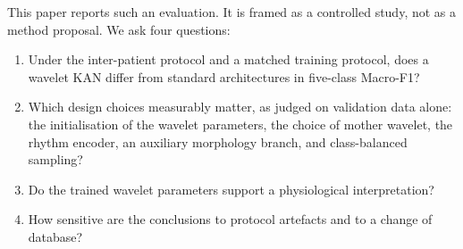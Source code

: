\documentclass[preprint,12pt]{elsarticle}
\begin{document}
This paper reports such an evaluation. It is framed as a controlled study, not as a method proposal. We ask four questions:
\begin{enumerate}
    \item[\textbf{RQ1}] Under the inter-patient protocol and a matched training protocol, does a wavelet KAN differ from standard architectures in five-class Macro-F1?
    \item[\textbf{RQ2}] Which design choices measurably matter, as judged on validation data alone: the initialisation of the wavelet parameters, the choice of mother wavelet, the rhythm encoder, an auxiliary morphology branch, and class-balanced sampling?
    \item[\textbf{RQ3}] Do the trained wavelet parameters support a physiological interpretation?
    \item[\textbf{RQ4}] How sensitive are the conclusions to protocol artefacts and to a change of database?
\end{enumerate}
\end{document}
